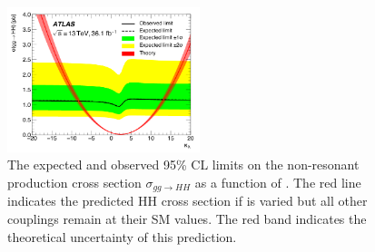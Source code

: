 \begin{figure}[H]
    \centering
    \includegraphics[width=0.5\textwidth]{Ch1/Img/kl_36ifb.png}
    \caption{The expected and observed 95\% CL limits on the non-resonant production cross section $\sigma_{gg\rightarrow HH}$ as a function of \kl. The red line indicates the predicted HH cross section if \kl is varied but all other couplings remain at their SM values. The red band indicates the theoretical uncertainty of this prediction.}
    \label{fig:chap1:HH:CM:KL}
\end{figure}
